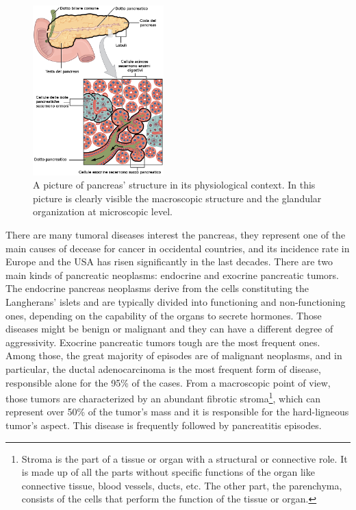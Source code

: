      \begin{figure}
         \centering
         \includegraphics[width = 0.45\textwidth]{images/pancr_struct_zoom}
         \caption{A picture of pancreas' structure in its physiological context. In this picture is clearly visible the macroscopic structure and the glandular organization at microscopic level.}
         \label{fig:panc_struct}
     \end{figure}

    There are many tumoral diseases interest the pancreas, they represent one of the main causes of decease for cancer in occidental countries, and its incidence rate in Europe and the USA has risen significantly in the last decades. There are two main kinds of pancreatic neoplasms: endocrine and exocrine pancreatic tumors. The endocrine pancreas neoplasms derive from the cells constituting the Langherans' islets and are typically divided into functioning and non-functioning ones, depending on the capability of the organs to secrete hormones. Those diseases might be benign or malignant and they can have a different degree of aggressivity. Exocrine pancreatic tumors tough are the most frequent ones. Among those, the great majority of episodes are of malignant neoplasms, and in particular, the ductal adenocarcinoma is the most frequent form of disease, responsible alone for the 95\% of the cases. From a macroscopic point of view, those tumors are characterized by an abundant fibrotic stroma\footnote{Stroma is the part of a tissue or organ with a structural or connective role. It is made up of all the parts without specific functions of the organ like connective tissue, blood vessels, ducts, etc. The other part, the parenchyma, consists of the cells that perform the function of the tissue or organ.}, which can represent over 50\% of the tumor's mass and it is responsible for the hard-ligneous tumor's aspect. This disease is frequently followed by pancreatitis episodes.

